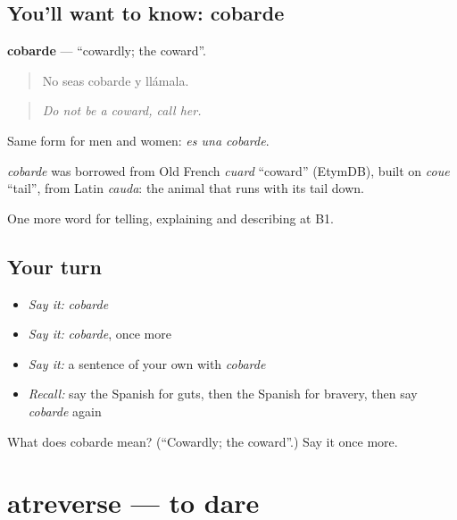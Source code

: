 \subsection*{You'll want to know: cobarde}
\textbf{cobarde} — \textquotedblleft{}cowardly; the coward\textquotedblright{}.

\begin{quote}
No seas cobarde y llámala.
\end{quote}

\begin{quote}
\emph{Do not be a coward, call her.}
\end{quote}

Same form for men and women: \emph{es una cobarde}.

\begin{cousinweb}
\emph{cobarde} was borrowed from Old French \emph{cuard} \textquotedblleft{}coward\textquotedblright{} (EtymDB), built on \emph{coue} \textquotedblleft{}tail\textquotedblright{}, from Latin \emph{cauda}: the animal that runs with its tail down.
\end{cousinweb}

\begin{grammarlens}[title={What you've built}]
One more word for telling, explaining and describing at B1.
\end{grammarlens}

\subsection*{Your turn}
\begin{itemize}
\raggedright
  \item \emph{Say it:} \emph{cobarde}
  \item \emph{Say it:} \emph{cobarde}, once more
  \item \emph{Say it:} a sentence of your own with \emph{cobarde}
  \item \emph{Recall:} say the Spanish for guts, then the Spanish for bravery, then say \emph{cobarde} again
\end{itemize}

\begin{tcolorbox}[breakable,colback=teal!4,colframe=teal!35!black,title={Before you move on}]
What does cobarde mean? (\textquotedblleft{}Cowardly; the coward\textquotedblright{}.) Say it once more.
\end{tcolorbox}
\section[atreverse]{atreverse — to dare}

